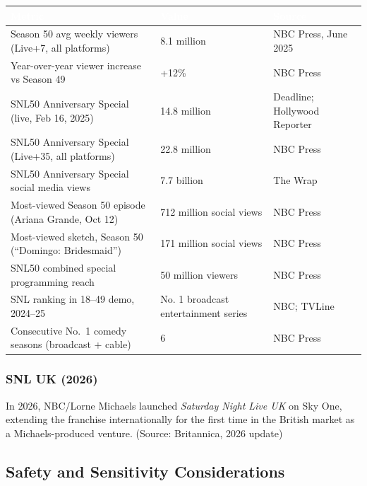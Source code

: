 \documentclass[11pt,letterpaper]{article}
\newcommand{\tableheader}[1]{\textbf{\sffamily\textcolor{white}{#1}}}
\begin{document}
\begin{center}
\begin{tabularx}{\textwidth}{XC{4cm}C{3cm}}
\toprule
{}
\tableheader{Metric} & \tableheader{Value} & \tableheader{Source} \\
\midrule
Season 50 avg weekly viewers (Live+7, all platforms) & 8.1 million & NBC Press, June 2025 \\
Year-over-year viewer increase vs Season 49 & +12\% & NBC Press \\
SNL50 Anniversary Special (live, Feb 16, 2025) & 14.8 million & Deadline; Hollywood Reporter \\
SNL50 Anniversary Special (Live+35, all platforms) & 22.8 million & NBC Press \\
SNL50 Anniversary Special social media views & 7.7 billion & The Wrap \\
Most-viewed Season 50 episode (Ariana Grande, Oct 12) & 712 million social views & NBC Press \\
Most-viewed sketch, Season 50 (``Domingo: Bridesmaid'') & 171 million social views & NBC Press \\
SNL50 combined special programming reach & 50 million viewers & NBC Press \\
SNL ranking in 18--49 demo, 2024--25 & No. 1 broadcast entertainment series & NBC; TVLine \\
Consecutive No.\ 1 comedy seasons (broadcast + cable) & 6 & NBC Press \\
\bottomrule
\end{tabularx}
\end{center}

\subsubsection{SNL UK (2026)}

In 2026, NBC/Lorne Michaels launched \textit{Saturday Night Live UK} on Sky One, extending the franchise internationally for the first time in the British market as a Michaels-produced venture. (Source: Britannica, 2026 update)

\subsection{Safety and Sensitivity Considerations}
\end{document}
